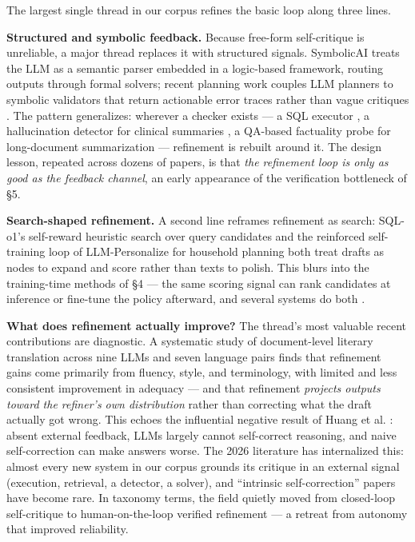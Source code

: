 \documentclass[
  11pt,
]{article}
\begin{document}
The largest single thread in our corpus refines the basic loop along
three lines.

\textbf{Structured and symbolic feedback.} Because free-form
self-critique is unreliable, a major thread replaces it with structured
signals. SymbolicAI \citep{dinu2024symbolicai} treats the LLM as a
semantic parser embedded in a logic-based framework, routing outputs
through formal solvers; recent planning work couples LLM planners to
symbolic validators that return actionable error traces rather than
vague critiques \citep{zhang2026reliable}. The pattern generalizes:
wherever a checker exists --- a SQL executor \citep{lyu2025sql}, a
hallucination detector for clinical summaries
\citep{seethakantha2026hallucination}, a QA-based factuality probe for
long-document summarization \citep{nguyen2026longsumeval} --- refinement
is rebuilt around it. The design lesson, repeated across dozens of
papers, is that \emph{the refinement loop is only as good as the
feedback channel}, an early appearance of the verification bottleneck of
§5.

\textbf{Search-shaped refinement.} A second line reframes refinement as
search: SQL-o1's self-reward heuristic search over query candidates
\citep{lyu2025sql} and the reinforced self-training loop of
LLM-Personalize for household planning \citep{han2024llm} both treat
drafts as nodes to expand and score rather than texts to polish. This
blurs into the training-time methods of §4 --- the same scoring signal
can rank candidates at inference or fine-tune the policy afterward, and
several systems do both \citep{genghan2025adaptive}.

\textbf{What does refinement actually improve?} The thread's most
valuable recent contributions are diagnostic. A systematic study of
document-level literary translation across nine LLMs and seven language
pairs \citep{tan2026llm} finds that refinement gains come primarily from
fluency, style, and terminology, with limited and less consistent
improvement in adequacy --- and that refinement \emph{projects outputs
toward the refiner's own distribution} rather than correcting what the
draft actually got wrong. This echoes the influential negative result of
Huang et al. \citep{huang2024cannotselfcorrect}: absent external
feedback, LLMs largely cannot self-correct reasoning, and naive
self-correction can make answers worse. The 2026 literature has
internalized this: almost every new system in our corpus grounds its
critique in an external signal (execution, retrieval, a detector, a
solver), and ``intrinsic self-correction'' papers have become rare. In
taxonomy terms, the field quietly moved from closed-loop self-critique
to human-on-the-loop verified refinement --- a retreat from autonomy
that improved reliability.
\end{document}
